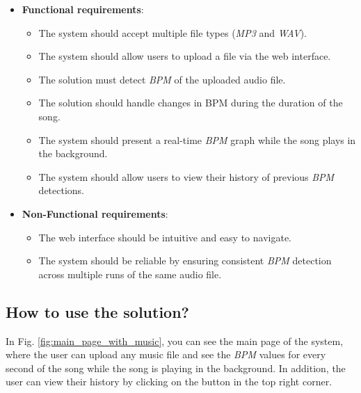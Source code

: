 \documentclass{IEEEtran}
\begin{document}
\begin{itemize}
    \item \textbf{Functional requirements}:
        \begin{itemize}
            \item The system should accept multiple file types (\textit{MP3} and \textit{WAV}).
            \item The system should allow users to upload a file via the web interface.
            \item The solution must detect \textit{BPM} of the uploaded audio file.
            \item The solution should handle changes in BPM during the duration of the song.
            \item The system should present a real-time \textit{BPM} graph while the song plays in the background. 
            \item The system should allow users to view their history of previous \textit{BPM} detections. 
        \end{itemize}
    \item \textbf{Non-Functional requirements}:
        \begin{itemize}
            \item The web interface should be intuitive and easy to navigate. 
            \item The system should be reliable by ensuring consistent \textit{BPM} detection across multiple runs of the same audio file.
        \end{itemize}
\end{itemize}

\subsection{How to use the solution?}

In Fig. \ref{fig:main_page_with_music}, you can see the main page of the system, where the user can upload any music file and see the \textit{BPM} values for every second of the song while the song is playing in the background. In addition, the user can view their history by clicking on the button in the top right corner.
\end{document}
